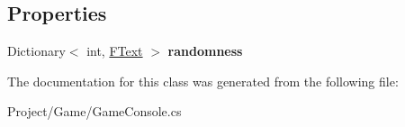 \subsection*{Properties}
\begin{DoxyCompactItemize}
\item 
\mbox{\label{class_lerp2_a_p_i_1_1_game_1_1_game_console_1_1_f_message_a470a5c18be28b088e3606cd52d9b80b8}} 
Dictionary$<$ int, \hyperlink{class_lerp2_a_p_i_1_1_game_1_1_game_console_1_1_f_text}{F\+Text} $>$ {\bfseries randomness}
\end{DoxyCompactItemize}


The documentation for this class was generated from the following file\+:\begin{DoxyCompactItemize}
\item 
Project/\+Game/Game\+Console.\+cs\end{DoxyCompactItemize}
